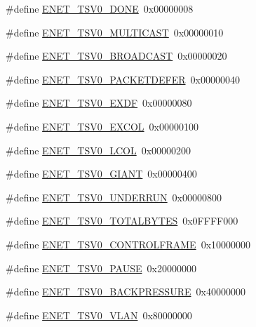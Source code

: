 \begin{DoxyCompactItemize}
\item 
\#define \hyperlink{group__ENET__17XX__40XX_ga93ca8c0d6c7224b4a8c41a077bbdf40d}{E\-N\-E\-T\-\_\-\-T\-S\-V0\-\_\-\-D\-O\-N\-E}~0x00000008
\item 
\#define \hyperlink{group__ENET__17XX__40XX_ga35811b54e0e0ff6e878184c9bc69c279}{E\-N\-E\-T\-\_\-\-T\-S\-V0\-\_\-\-M\-U\-L\-T\-I\-C\-A\-S\-T}~0x00000010
\item 
\#define \hyperlink{group__ENET__17XX__40XX_ga8c81671c6a9577c6bd4cbfca14d0d699}{E\-N\-E\-T\-\_\-\-T\-S\-V0\-\_\-\-B\-R\-O\-A\-D\-C\-A\-S\-T}~0x00000020
\item 
\#define \hyperlink{group__ENET__17XX__40XX_gac2d842291755f2488ce8b4ad9d189f6f}{E\-N\-E\-T\-\_\-\-T\-S\-V0\-\_\-\-P\-A\-C\-K\-E\-T\-D\-E\-F\-E\-R}~0x00000040
\item 
\#define \hyperlink{group__ENET__17XX__40XX_ga7cb26ea3f926fb8f7950bbbc98eb2d61}{E\-N\-E\-T\-\_\-\-T\-S\-V0\-\_\-\-E\-X\-D\-F}~0x00000080
\item 
\#define \hyperlink{group__ENET__17XX__40XX_ga70a4c2d8bcefc36d60b2a006ff3f7496}{E\-N\-E\-T\-\_\-\-T\-S\-V0\-\_\-\-E\-X\-C\-O\-L}~0x00000100
\item 
\#define \hyperlink{group__ENET__17XX__40XX_ga51155a3f13ea78c0a858b402212b8b67}{E\-N\-E\-T\-\_\-\-T\-S\-V0\-\_\-\-L\-C\-O\-L}~0x00000200
\item 
\#define \hyperlink{group__ENET__17XX__40XX_ga2cc9638b9a72a6aca275ce4aed3701a7}{E\-N\-E\-T\-\_\-\-T\-S\-V0\-\_\-\-G\-I\-A\-N\-T}~0x00000400
\item 
\#define \hyperlink{group__ENET__17XX__40XX_ga62faeddfcb2c47a79c79eafd0d53ae70}{E\-N\-E\-T\-\_\-\-T\-S\-V0\-\_\-\-U\-N\-D\-E\-R\-R\-U\-N}~0x00000800
\item 
\#define \hyperlink{group__ENET__17XX__40XX_gaced2c895c68a65e25f18810332a9e60c}{E\-N\-E\-T\-\_\-\-T\-S\-V0\-\_\-\-T\-O\-T\-A\-L\-B\-Y\-T\-E\-S}~0x0\-F\-F\-F\-F000
\item 
\#define \hyperlink{group__ENET__17XX__40XX_ga2ab4cf2c962a57d2b59cdac5324caf08}{E\-N\-E\-T\-\_\-\-T\-S\-V0\-\_\-\-C\-O\-N\-T\-R\-O\-L\-F\-R\-A\-M\-E}~0x10000000
\item 
\#define \hyperlink{group__ENET__17XX__40XX_ga389586db52739a1a88da7059b813cf80}{E\-N\-E\-T\-\_\-\-T\-S\-V0\-\_\-\-P\-A\-U\-S\-E}~0x20000000
\item 
\#define \hyperlink{group__ENET__17XX__40XX_ga0a02af6e44148eb10ad3872f558a7d75}{E\-N\-E\-T\-\_\-\-T\-S\-V0\-\_\-\-B\-A\-C\-K\-P\-R\-E\-S\-S\-U\-R\-E}~0x40000000
\item 
\#define \hyperlink{group__ENET__17XX__40XX_gacc8396f1c837bf51215f1f29a062bba4}{E\-N\-E\-T\-\_\-\-T\-S\-V0\-\_\-\-V\-L\-A\-N}~0x80000000

\end{DoxyCompactItemize}
